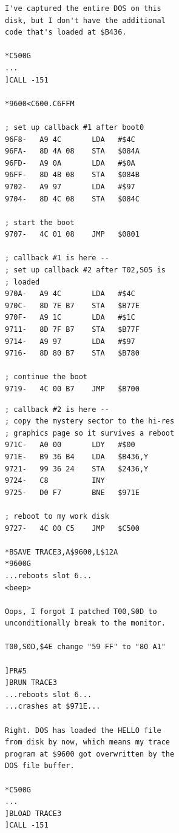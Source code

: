 \documentclass{article}
\begin{document}
\vspace*{\fill}

\newpage

\begin{verbatim}
I've captured the entire DOS on this
disk, but I don't have the additional
code that's loaded at $B436.

*C500G
...
]CALL -151

*9600<C600.C6FFM

; set up callback #1 after boot0
96F8-   A9 4C       LDA   #$4C
96FA-   8D 4A 08    STA   $084A
96FD-   A9 0A       LDA   #$0A
96FF-   8D 4B 08    STA   $084B
9702-   A9 97       LDA   #$97
9704-   8D 4C 08    STA   $084C

; start the boot
9707-   4C 01 08    JMP   $0801

; callback #1 is here --
; set up callback #2 after T02,S05 is
; loaded
970A-   A9 4C       LDA   #$4C
970C-   8D 7E B7    STA   $B77E
970F-   A9 1C       LDA   #$1C
9711-   8D 7F B7    STA   $B77F
9714-   A9 97       LDA   #$97
9716-   8D 80 B7    STA   $B780

; continue the boot
9719-   4C 00 B7    JMP   $B700
\end{verbatim}

\newpage

\begin{verbatim}
; callback #2 is here --
; copy the mystery sector to the hi-res
; graphics page so it survives a reboot
971C-   A0 00       LDY   #$00
971E-   B9 36 B4    LDA   $B436,Y
9721-   99 36 24    STA   $2436,Y
9724-   C8          INY
9725-   D0 F7       BNE   $971E

; reboot to my work disk
9727-   4C 00 C5    JMP   $C500

*BSAVE TRACE3,A$9600,L$12A
*9600G
...reboots slot 6...
<beep>

Oops, I forgot I patched T00,S0D to
unconditionally break to the monitor.

T00,S0D,$4E change "59 FF" to "80 A1"

]PR#5
]BRUN TRACE3
...reboots slot 6...
...crashes at $971E...

Right. DOS has loaded the HELLO file
from disk by now, which means my trace
program at $9600 got overwritten by the
DOS file buffer.

*C500G
...
]BLOAD TRACE3
]CALL -151
\end{verbatim}

\newpage
\end{document}
